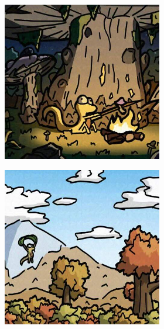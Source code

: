 \documentclass{article}
\begin{document}
\begin{figure}[h]
\begin{subfigure}[t]{\textwidth}
\begin{subfigure}[b]{0.24\textwidth}
     \end{subfigure}
     \hfill
     \begin{subfigure}[b]{0.24\textwidth}
         \centering
         \includegraphics[width=\textwidth]{plots/process/mist/0005.jpeg}
     \end{subfigure}
     \hfill
     \begin{subfigure}[b]{0.24\textwidth}
         \centering
         \includegraphics[width=\textwidth]{plots/process/mist/0009.jpeg}

\end{subfigure}
\end{subfigure}
\end{figure}
\end{document}
